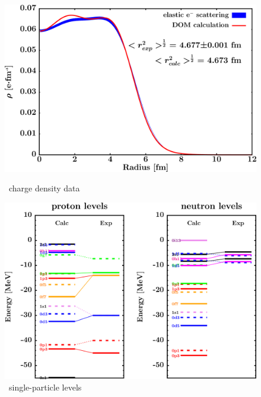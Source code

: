 \begin{figure}[H]
    \centering
    \begin{minipage}{0.45\textwidth}
        \centering
        \includegraphics[width=1.0\textwidth]{figures/sn124_chargeDensity.png}
        \caption{\snFour\ charge density data}
        \label{DOMFitData_sn124_chargeDensity}
    \end{minipage}\hfill
    \begin{minipage}{0.45\textwidth}
        \centering
        \includegraphics[width=1.0\textwidth]{figures/sn124_SPLevels.png}
        \caption{\snFour\ single-particle levels}
        \label{DOMFitData_sn124_SPLevels}
    \end{minipage}
\end{figure}

\afterpage{\clearpage}

